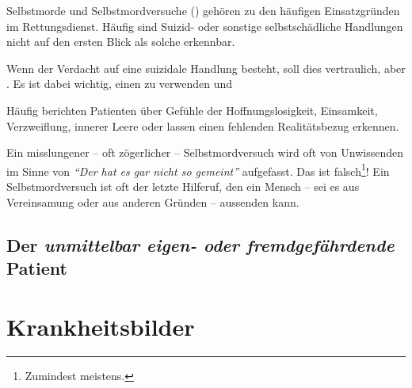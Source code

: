 Selbstmorde und Selbstmordversuche () gehören zu den
häufigen Einsatzgründen im Rettungsdienst. Häufig sind
Suizid- oder sonstige selbstschädliche Handlungen nicht auf
den ersten Blick als solche erkennbar. 

Wenn der Verdacht auf eine suizidale Handlung besteht, soll
dies vertraulich, aber . Es ist dabei wichtig, einen 
zu verwenden und 

\begin{quotation}

\end{quotation}

Häufig berichten Patienten über Gefühle der
Hoffnungslosigkeit, Einsamkeit, Verzweiflung, innerer Leere
oder lassen einen fehlenden Realitätsbezug erkennen.


Ein misslungener -- oft zögerlicher -- Selbstmordversuch
wird oft von Unwissenden im Sinne von \emph{\enquote{Der hat es gar nicht so gemeint}}
aufgefasst. Das ist falsch\footnote{Zumindest meistens.}!
Ein Selbstmordversuch ist oft der letzte Hilferuf, den ein
Mensch -- sei es aus Vereinsamung oder aus anderen Gründen
-- aussenden kann. 



\subsection{Der \emph{unmittelbar eigen- oder
fremdgefährdende} Patient}
\label{topic:unterbringung}
\label{topic:suizid2}







\bigskip

\section{Krankheitsbilder}

